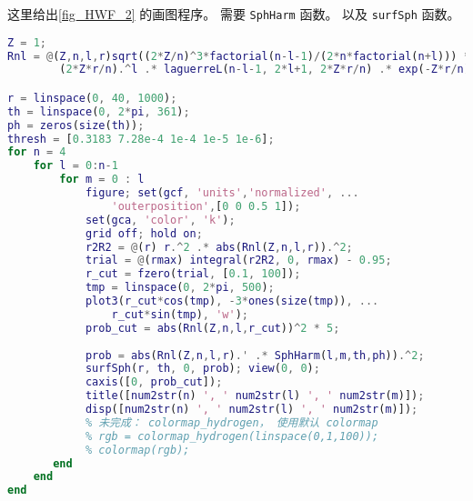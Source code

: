
\begin{issues}
\issueDraft
\end{issues}


这里给出\autoref{fig_HWF_2}  的画图程序。 需要 \verb`SphHarm` 函数。 以及 \verb`surfSph` 函数。

\begin{lstlisting}[language=matlab, caption=hydrogen\_plot.m]
Z = 1;
Rnl = @(Z,n,l,r)sqrt((2*Z/n)^3*factorial(n-l-1)/(2*n*factorial(n+l))) *...
        (2*Z*r/n).^l .* laguerreL(n-l-1, 2*l+1, 2*Z*r/n) .* exp(-Z*r/n);

r = linspace(0, 40, 1000);
th = linspace(0, 2*pi, 361);
ph = zeros(size(th));
thresh = [0.3183 7.28e-4 1e-4 1e-5 1e-6];
for n = 4
    for l = 0:n-1
        for m = 0 : l
            figure; set(gcf, 'units','normalized', ...
                'outerposition',[0 0 0.5 1]);
            set(gca, 'color', 'k');
            grid off; hold on;
            r2R2 = @(r) r.^2 .* abs(Rnl(Z,n,l,r)).^2;
            trial = @(rmax) integral(r2R2, 0, rmax) - 0.95;
            r_cut = fzero(trial, [0.1, 100]);
            tmp = linspace(0, 2*pi, 500);
            plot3(r_cut*cos(tmp), -3*ones(size(tmp)), ...
                r_cut*sin(tmp), 'w');
            prob_cut = abs(Rnl(Z,n,l,r_cut))^2 * 5;
            
            prob = abs(Rnl(Z,n,l,r).' .* SphHarm(l,m,th,ph)).^2;
            surfSph(r, th, 0, prob); view(0, 0);
            caxis([0, prob_cut]);
            title([num2str(n) ', ' num2str(l) ', ' num2str(m)]);
            disp([num2str(n) ', ' num2str(l) ', ' num2str(m)]);
            % 未完成： colormap_hydrogen， 使用默认 colormap
            % rgb = colormap_hydrogen(linspace(0,1,100));
            % colormap(rgb);
       end
    end
end
\end{lstlisting}
